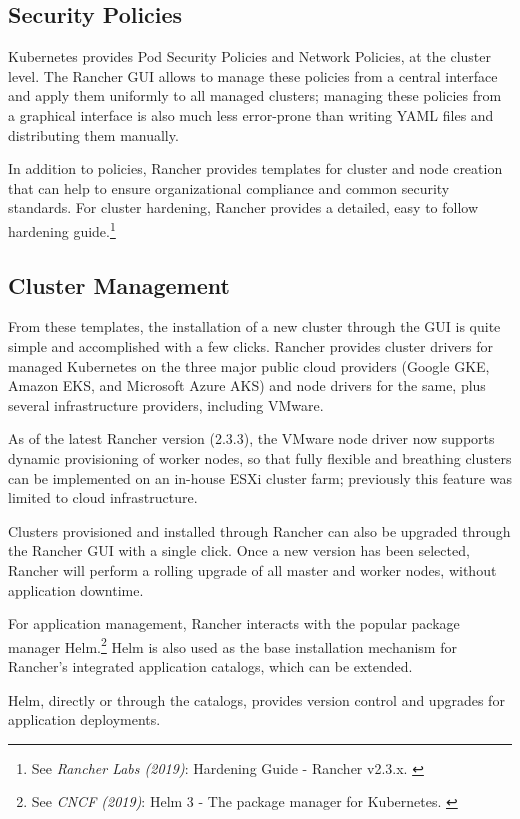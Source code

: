 \subsection{Security Policies}

Kubernetes provides Pod Security Policies and Network Policies, at the cluster level. The Rancher GUI allows to manage these policies from a central interface and apply them uniformly to all managed clusters; managing these policies from a graphical interface is also much less error-prone than writing YAML files and distributing them manually.

In addition to policies, Rancher provides templates for cluster and node creation that can help to ensure organizational compliance and common security standards. For cluster hardening, Rancher provides a detailed, easy to follow hardening guide.\footnote{See \textit{Rancher Labs (2019)}: Hardening Guide - Rancher v2.3.x. \cite{hardeningGuide}}

\subsection{Cluster Management}

From these templates, the installation of a new cluster through the GUI is quite simple and accomplished with a few clicks. Rancher provides cluster drivers for managed Kubernetes on the three major public cloud providers (Google GKE, Amazon EKS, and Microsoft Azure AKS) and node drivers for the same, plus several infrastructure providers, including VMware.

As of the latest Rancher version (2.3.3), the VMware node driver now supports dynamic provisioning of worker nodes, so that fully flexible and breathing clusters can be implemented on an in-house ESXi cluster farm; previously this feature was limited to cloud infrastructure.

Clusters provisioned and installed through Rancher can also be upgraded through the Rancher GUI with a single click. Once a new version has been selected, Rancher will perform a rolling upgrade of all master and worker nodes, without application downtime.

For application management, Rancher interacts with the popular package manager Helm.\footnote{See \textit{CNCF (2019)}: Helm 3 - The package manager for Kubernetes. \cite{helm}} Helm is also used as the base installation mechanism for Rancher's integrated application catalogs, which can be extended.

Helm, directly or through the catalogs, provides version control and upgrades for application deployments.

